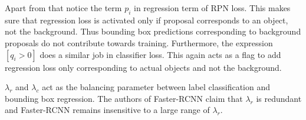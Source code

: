Apart from that notice the term $p_i$ in regression term of RPN loss. This makes sure that regression loss is activated only if proposal corresponds to an object, not the background.  Thus bounding box predictions corresponding to background proposals do not contribute towards training. Furthermore, the expression $[q_i>0]$ does a similar job in classifier loss. This again acts as a flag to add regression loss only corresponding to actual objects and not the background. 

$\lambda_r$ and $\lambda_c$ act as the balancing parameter  between label classification and bounding box regression. The authors of Faster-RCNN claim that $\lambda_r$ is redundant and Faster-RCNN remains insensitive to a large range of $\lambda_r$. 



\newpage














